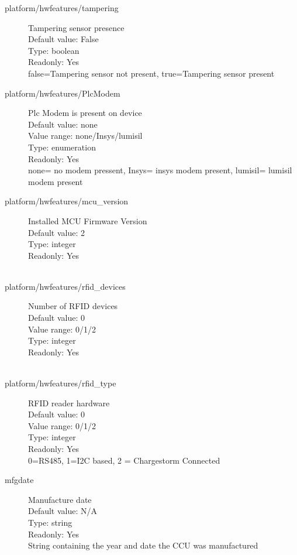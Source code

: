\begin{description}
\item[platform/hwfeatures/tampering] Tampering sensor presence\\
  Default value: False\\
  Type: boolean\\
  Readonly: Yes\\
  false=Tampering sensor not present, true=Tampering sensor present\\

\item[platform/hwfeatures/PlcModem] Plc Modem is present on device\\
  Default value: none\\
  Value range: none/Insys/lumisil\\
  Type: enumeration\\
  Readonly: Yes\\
  none= no modem pressent, Insys= insys modem present, lumisil= lumisil modem present\\

\item[platform/hwfeatures/mcu\_version] Installed MCU Firmware Version\\
  Default value: 2\\
  Type: integer\\
  Readonly: Yes\\
  \\

\item[platform/hwfeatures/rfid\_devices] Number of RFID devices\\
  Default value: 0\\
  Value range: 0/1/2\\
  Type: integer\\
  Readonly: Yes\\
  \\

\item[platform/hwfeatures/rfid\_type] RFID reader hardware\\
  Default value: 0\\
  Value range: 0/1/2\\
  Type: integer\\
  Readonly: Yes\\
  0=RS485, 1=I2C based, 2 = Chargestorm Connected\\

\item[mfgdate] Manufacture date\\
  Default value: N/A\\
  Type: string\\
  Readonly: Yes\\
  String containing the year and date the CCU was manufactured\\


\end{description}
